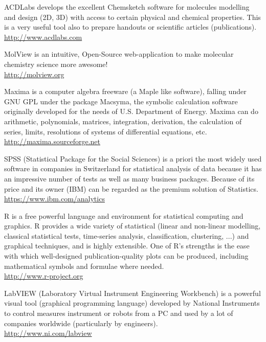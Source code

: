 	{\Large {}}{\Large {}} ACDLabs develops the excellent Chemsketch software for molecules modelling and design (2D, 3D) with access to certain physical and chemical properties. This is a very useful tool also to prepare handouts or scientific articles (publications).\\
	\href{http://www.acdlabs.com}{\color{blue}http://www.acdlabs.com}
	
	{\Large {}}{\Large {}}{\Large {}} MolView is an intuitive, Open-Source web-application to make molecular chemistry science more awesome!\\
	\href{http://molview.org}{\color{blue}http://molview.org}
	
	{\Large {}}{\Large {}} Maxima is a computer algebra freeware (a Maple like software), falling under GNU GPL under the package Macsyma, the symbolic calculation software originally developed for the needs of U.S. Department of Energy. Maxima can do arithmetic, polynomials, matrices, integration, derivation, the calculation of series, limits, resolutions of systems of differential equations, etc.\\
	\href{http://maxima.sourceforge.net}{\color{blue}http://maxima.sourceforge.net}
	
	{\Large {}}{\Large {}} SPSS (Statistical Package for the Social Sciences) is a priori the most widely used software in companies in Switzerland for statistical analysis of data because it has an impressive number of tests as well as many business packages. Because of its price and its owner (IBM) can be regarded as the premium solution of Statistics.\\
	\href{https://www.ibm.com/analytics}{\color{blue}https://www.ibm.com/analytics}
	
	{\Large {}}{\Large {}}{\Large {}} R is a free powerful language and environment for statistical computing and graphics. R provides a wide variety of statistical (linear and non-linear modelling, classical statistical tests, time-series analysis, classification, clustering, ...) and graphical techniques, and is highly extensible. One of R's strengths is the ease with which well-designed publication-quality plots can be produced, including mathematical symbols and formulae where needed.\\
	\href{http://www.r-project.org}{\color{blue}http://www.r-project.org}
	
	{\Large {}}{\Large {}} LabVIEW (Laboratory Virtual Instrument Engineering Workbench) is a powerful visual tool (graphical programming language) developed by National Instruments to control measures instrument or robots from a PC and used by a lot of companies worldwide (particularly by engineers).\\
	\href{http://www.ni.com/labview}{\color{blue}http://www.ni.com/labview}
	

